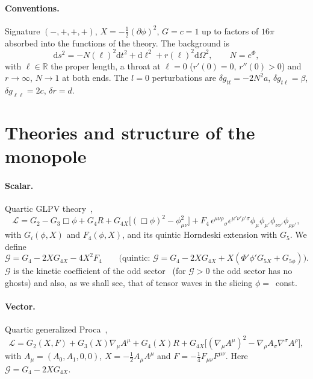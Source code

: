 \documentclass[11pt,a4paper]{article}
\theoremstyle{remark}
\newcommand{\G}{\mathcal G}
\newcommand{\dd}{\mathrm d}
\begin{document}
\paragraph{Conventions.} Signature $(-,+,+,+)$, $X=-\tfrac12(\partial\phi)^2$, $G=c=1$ up to factors of $16\pi$ absorbed into the functions of the theory. The background is
\begin{equation}
\dd s^2=-N(\ell)^2\dd t^2+\dd\ell^2+r(\ell)^2\dd\Omega^2,\qquad N=e^{\Phi},
\label{eq:background}
\end{equation}
with $\ell\in\mathbb R$ the proper length, a throat at $\ell=0$ ($r'(0)=0$, $r''(0)>0$) and $r\to\infty$, $N\to1$ at both ends. The $l=0$ perturbations are $\delta g_{tt}=-2N^2a$, $\delta g_{t\ell}=\beta$, $\delta g_{\ell\ell}=2c$, $\delta r=d$.

\section{Theories and structure of the monopole}\label{sec:framework}

\paragraph{Scalar.} Quartic GLPV theory~\cite{GLPV,Kobayashi},
\begin{equation}
\mathcal L=G_2-G_3\Box\phi+G_4R+G_{4X}\big[(\Box\phi)^2-\phi_{\mu\nu}^2\big]+F_4\,\epsilon^{\mu\nu\rho}{}_{\sigma}\epsilon^{\mu'\nu'\rho'\sigma}\phi_\mu\phi_{\mu'}\phi_{\nu\nu'}\phi_{\rho\rho'},
\label{eq:GLPV}
\end{equation}
with $G_i(\phi,X)$ and $F_4(\phi,X)$, and its quintic Horndeski extension with $G_5$. We define
\begin{equation}
\G=G_4-2XG_{4X}-4X^2F_4\qquad\big(\text{quintic: }\G=G_4-2XG_{4X}+X(\Phi'\phi'G_{5X}+G_{5\phi})\big).
\label{eq:Gcal}
\end{equation}
$\G$ is the kinetic coefficient of the odd sector~\cite{KMS1} (for $\G>0$ the odd sector has no ghosts) and also, as we shall see, that of tensor waves in the slicing $\phi=$~const.

\paragraph{Vector.} Quartic generalized Proca~\cite{Heisenberg},
\begin{equation}
\mathcal L=G_2(X,F)+G_3(X)\nabla_\mu A^\mu+G_4(X)R+G_{4X}\big[(\nabla_\mu A^\mu)^2-\nabla_\rho A_\sigma\nabla^\sigma A^\rho\big],
\end{equation}
with $A_\mu=(A_0,A_1,0,0)$, $X=-\tfrac12A_\mu A^\mu$ and $F=-\tfrac14F_{\mu\nu}F^{\mu\nu}$. Here $\G=G_4-2XG_{4X}$.
\end{document}
